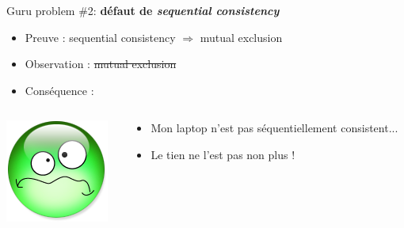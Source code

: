 \documentclass[xcolor={x11names,svgnames},x11names,svgnames]{beamer}
\begin{document}

\begin{frame}[label=peterson_report1, fragile]

  \begin{block}{Guru problem \#2: \bfseries défaut de \emph{sequential consistency}}

    \begin{itemize}
    \item Preuve : sequential consistency $\Rightarrow$ mutual exclusion
    \item Observation : \sout{mutual exclusion}
    \item Conséquence : 
    \end{itemize}
    
    \begin{columns}[c]
    \begin{column}{.1\textwidth}
      \includegraphics[width=\textwidth]{triste.png}
    \end{column}
    \begin{column}{.9\textwidth}
      \begin{itemize}
      \item Mon laptop n'est pas séquentiellement consistent...
        \pause
      \item Le tien ne l'est pas non plus !
      \end{itemize}
    \end{column}
  \end{columns}

\end{block}
\end{frame}
\end{document}
